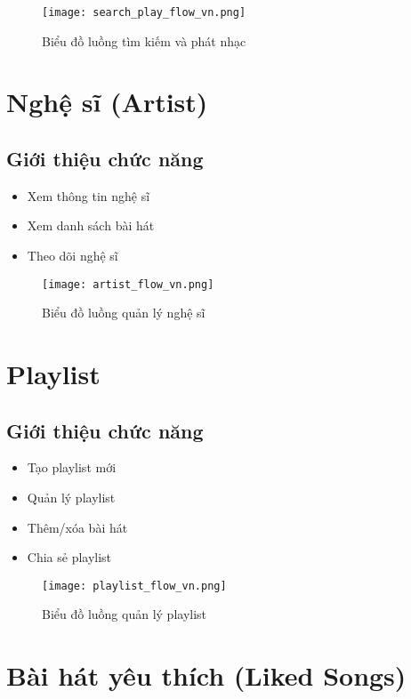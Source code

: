 \documentclass{book}
\let\oldsection\section
\renewcommand{\section}{\clearpage\oldsection}
\begin{document}
\begin{figure}[htbp]
    \centering
    \texttt{[image: search\_play\_flow\_vn.png]}
    \caption{Biểu đồ luồng tìm kiếm và phát nhạc}
    \label{fig:search_play_flow}
\end{figure}

\section{Nghệ sĩ (Artist)}
\subsection{Giới thiệu chức năng}
\begin{itemize}
    \item Xem thông tin nghệ sĩ
    \item Xem danh sách bài hát
    \item Theo dõi nghệ sĩ
\end{itemize}

\begin{figure}[htbp]
    \centering
    \texttt{[image: artist\_flow\_vn.png]}
    \caption{Biểu đồ luồng quản lý nghệ sĩ}
    \label{fig:artist_flow}
\end{figure}

\section{Playlist}
\subsection{Giới thiệu chức năng}
\begin{itemize}
    \item Tạo playlist mới
    \item Quản lý playlist
    \item Thêm/xóa bài hát
    \item Chia sẻ playlist
\end{itemize}

\begin{figure}[htbp]
    \centering
    \texttt{[image: playlist\_flow\_vn.png]}
    \caption{Biểu đồ luồng quản lý playlist}
    \label{fig:playlist_flow}
\end{figure}

\section{Bài hát yêu thích (Liked Songs)}
\end{document}
